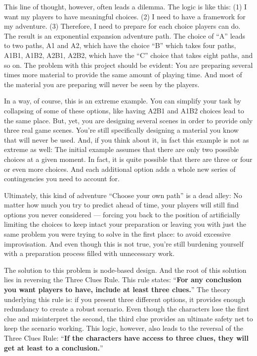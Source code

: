 \begin{multicols}{2}
This line of thought, however, often leads a dilemma. The logic is like this: (1) I want my players to have meaningful choices. (2) I need to have a framework for my adventure. (3) Therefore, I need to prepare for each choice players can do. The result is an exponential expansion adventure path. The choice of ``A'' leads to two paths, A1 and A2, which have the choice ``B'' which takes four paths, A1B1, A1B2, A2B1, A2B2, which have the ``C'' choice that takes eight paths, and so on. The problem with this project should be evident: You are preparing several times more material to provide the same amount of playing time. And most of the material you are preparing will never be seen by the players.

In a way, of course, this is an extreme example. You can simplify your task by collapsing of some of these options, like having A2B1 and A1B2 choices lead to the same place. But, yet, you are designing several scenes in order to provide only three real game scenes. You’re still specifically designing a material you know that will never be used. And, if you think about it, in fact this example is not as extreme as well: The initial example assumes that there are only two possible choices at a given moment. In fact, it is quite possible that there are three or four or even more choices. And each additional option adds a whole new series of contingencies you need to account for.

Ultimately, this kind of adventure ``Choose your own path'' is a dead alley: No matter how much you try to predict ahead of time, your players will still find options you never considered --- forcing you back to the position of artificially limiting the choices to keep intact your preparation or leaving you with just the same problem you were trying to solve in the first place: to avoid excessive improvisation. And even though this is not true, you're still burdening yourself with a preparation process filled with unnecessary work.

The solution to this problem is node-based design. And the root of this solution lies in reversing the Three Clues Rule. This rule states: ``\textbf{For any conclusion you want players to have, include at least three clues.}'' The theory underlying this rule is: if you present three different options, it provides enough redundancy to create a robust scenario. Even though the characters lose the first clue and misinterpret the second, the third clue provides an ultimate safety net to keep the scenario working. This logic, however, also leads to the reversal of the Three Clues Rule: ``\textbf{If the characters have access to three clues, they will get at least to a conclusion.}''


\end{multicols}
